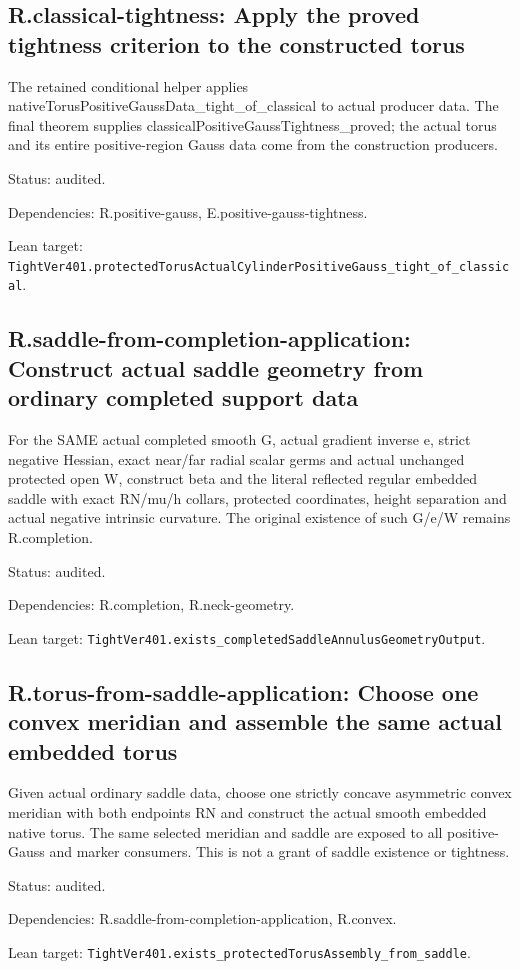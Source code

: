 \documentclass{article}
\begin{document}
\subsection*{R.classical-tightness: Apply the proved tightness criterion to the constructed torus}
The retained conditional helper applies nativeTorusPositiveGaussData\_tight\_of\_classical to actual producer data. The final theorem supplies classicalPositiveGaussTightness\_proved; the actual torus and its entire positive-region Gauss data come from the construction producers.
\par Status: audited.
\par Dependencies: R.positive-gauss, E.positive-gauss-tightness.
\par Lean target: \texttt{TightVer401.protectedTorusActualCylinderPositiveGauss\_tight\_of\_classical}.
\subsection*{R.saddle-from-completion-application: Construct actual saddle geometry from ordinary completed support data}
For the SAME actual completed smooth G, actual gradient inverse e, strict negative Hessian, exact near/far radial scalar germs and actual unchanged protected open W, construct beta and the literal reflected regular embedded saddle with exact RN/mu/h collars, protected coordinates, height separation and actual negative intrinsic curvature. The original existence of such G/e/W remains R.completion.
\par Status: audited.
\par Dependencies: R.completion, R.neck-geometry.
\par Lean target: \texttt{TightVer401.exists\_completedSaddleAnnulusGeometryOutput}.
\subsection*{R.torus-from-saddle-application: Choose one convex meridian and assemble the same actual embedded torus}
Given actual ordinary saddle data, choose one strictly concave asymmetric convex meridian with both endpoints RN and construct the actual smooth embedded native torus. The same selected meridian and saddle are exposed to all positive-Gauss and marker consumers. This is not a grant of saddle existence or tightness.
\par Status: audited.
\par Dependencies: R.saddle-from-completion-application, R.convex.
\par Lean target: \texttt{TightVer401.exists\_protectedTorusAssembly\_from\_saddle}.
\end{document}
